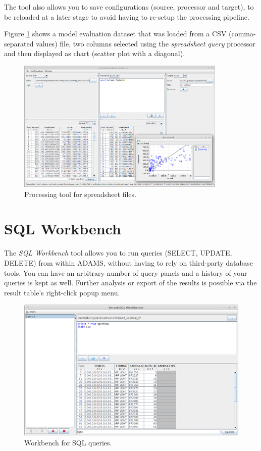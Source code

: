 \documentclass[a4paper]{book}
\begin{document}
The tool also allows you to save configurations (source, processor and target), to be
reloaded at a later stage to avoid having to re-setup the processing pipeline.

Figure \ref{spreadsheet-processor} shows a model evaluation
dataset that was loaded from a CSV (comma-separated values) file, two columns
selected using the \textit{spreadsheet query} processor and then displayed
as chart (scatter plot with a diagonal).

\begin{figure}[htb]
  \centering
  \includegraphics[width=10.0cm]{images/spreadsheet-processor.png}
  \caption{Processing tool for spreadsheet files.}
  \label{spreadsheet-processor}
\end{figure}


\clearpage
\section{SQL Workbench}
The \textit{SQL Workbench} tool allows you to run queries (SELECT, UPDATE, DELETE)
from within ADAMS, without having to rely on third-party database tools. You can
have an arbitrary number of query panels and a history of your queries is kept
as well. Further analysis or export of the results is possible via the result table's
right-click popup menu.

\begin{figure}[htb]
  \centering
  \includegraphics[width=12.0cm]{images/sqlworkbench.png}
  \caption{Workbench for SQL queries.}
  \label{sqlworkbench}
\end{figure}
\end{document}
